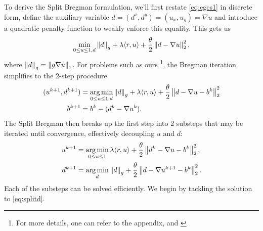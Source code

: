 To derive the Split Bregman formulation, we'll first restate \eqref{eq:egcs1} in discrete form, define the auxiliary variable $d = (d^x, d^y) = (u_x, u_y) = \nabla u$ and introduce a quadratic penalty function to weakly enforce this equality. This gets us 
\begin{align*}
\min_{0\leq u \leq 1, d} 
 \left\lVert d \right\rVert_g + \lambda  \langle r, u \rangle
+ \frac{\theta}{2} \left\lVert d - \nabla u \right\rVert_2^2,
\end{align*}
where $\left\lVert d\right\rVert_g = \left\lVert g \nabla u\right\rVert_1$. For problems such as ours \footnote{For more details, one can refer to the appendix, and \cite{goldstein2009split,goldstein2010geometric}}, the Bregman iteration simplifies to the 2-step procedure 
\begin{align}
(u^{k+1}, d^{k+1}) 
&= \operatorname*{arg\,min}_{0\leq u \leq 1, d}  \left\lVert d\right\rVert_g + \lambda \langle r, u \rangle + \frac{\theta}{2} \left\lVert d - \nabla u - b^k \right\rVert^2_2 
\\
b^{k+1} &= b^k - (d^k - \nabla u^k) .
\label{eq:sbbij}
\end{align} 
The Split Bregman then breaks up the first step into 2 substeps that may be iterated until convergence, effectively decoupling $u$ and $d$: 
\begin{align}
u^{k+1} &= \operatorname*{arg\,min}_{0\leq u \leq 1} \lambda \langle r, u \rangle
+ \frac{\theta}{2} \left\lVert d^k - \nabla u - b^k \right\rVert^2_2,
\label{eq:splitu}
\\
d^{k+1} 
&= \operatorname*{arg\,min}_d \left\lVert d\right\rVert_g + \frac{\theta}{2} \left\lVert d - \nabla u^{k+1} - b^k\right\rVert^2_2.
\label{eq:splitd}
\end{align}
Each of the substeps can be solved efficiently. We begin by tackling the solution to \eqref{eq:splitd}.

